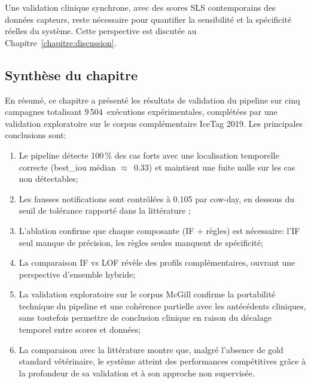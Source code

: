 Une validation clinique synchrone, avec des scores SLS contemporains des données
capteurs, reste nécessaire pour quantifier la sensibilité et la spécificité réelles
du système. Cette perspective est discutée au Chapitre~\ref{chapitre:discussion}.

\FloatBarrier
\subsection{Synthèse du chapitre}

En résumé, ce chapitre a présenté les résultats de validation du pipeline sur cinq campagnes totalisant
9\,504~exécutions expérimentales, complétées par une validation exploratoire sur le corpus
complémentaire IceTag 2019. Les principales conclusions sont:
\begin{enumerate}
    \item Le pipeline détecte 100\,\% des cas forts avec une localisation temporelle
    correcte (best\_iou médian $\approx$~0.33) et maintient une fuite nulle sur les cas
    non détectables;
    \item Les fausses notifications sont contrôlées à 0.105 par cow-day, en dessous du seuil
    de tolérance rapporté dans la littérature \citep{rutten2013invited};
    \item L'ablation confirme que chaque composante (IF + règles) est nécessaire: l'IF seul
    manque de précision, les règles seules manquent de spécificité;
    \item La comparaison IF vs LOF révèle des profils complémentaires, ouvrant une
    perspective d'ensemble hybride;
    \item La validation exploratoire sur le corpus McGill confirme la portabilité technique
    du pipeline et une cohérence partielle avec les antécédents cliniques, sans toutefois
    permettre de conclusion clinique en raison du décalage temporel entre scores et données;
    \item La comparaison avec la littérature montre que, malgré l'absence de gold standard
    vétérinaire, le système atteint des performances compétitives grâce à la profondeur de
    sa validation et à son approche non supervisée.
\end{enumerate}
